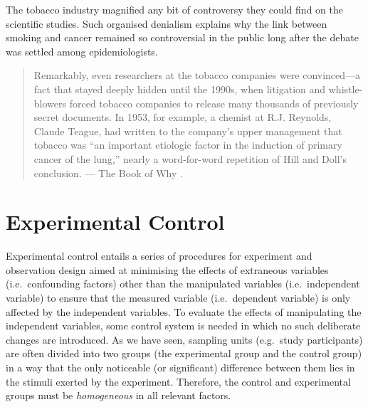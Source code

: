 \documentclass[
]{book}
\begin{document}
The tobacco industry magnified any bit of controversy they could find on the scientific studies. Such organised denialism explains why the link between smoking and cancer remained so controversial in the public long after the debate was settled among epidemiologists.

\begin{quote}
Remarkably, even researchers at the tobacco companies were convinced---a fact that stayed deeply hidden until the 1990s, when litigation and whistle-blowers forced tobacco companies to release many thousands of previously secret documents. In 1953, for example, a chemist at R.J. Reynolds, Claude Teague, had written to the company's upper management that tobacco was ``an important etiologic factor in the induction of primary cancer of the lung,'' nearly a word-for-word repetition of Hill and Doll's conclusion. --- The Book of Why \citep{book-of-why}.
\end{quote}

\hypertarget{experimental-control}{%
\section{Experimental Control}\label{experimental-control}}

Experimental control entails a series of procedures for experiment and observation design aimed at minimising the effects of extraneous variables (i.e.~confounding factors) other than the manipulated variables (i.e.~independent variable) to ensure that the measured variable (i.e.~dependent variable) is only affected by the independent variables. To evaluate the effects of manipulating the independent variables, some control system is needed in which no such deliberate changes are introduced. As we have seen, sampling units (e.g.~study participants) are often divided into two groups (the experimental group and the control group) in a way that the only noticeable (or significant) difference between them lies in the stimuli exerted by the experiment.
Therefore, the control and experimental groups must be \emph{homogeneous} in all relevant factors.
\end{document}

